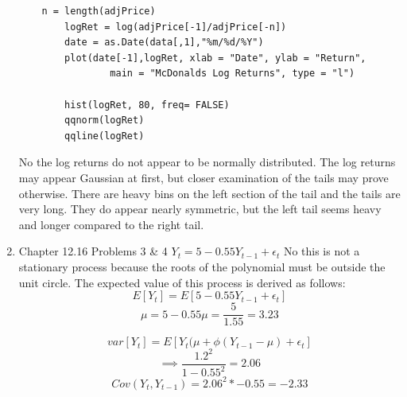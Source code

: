 \documentclass[letterpaper,12pt]{article}
\begin{document}
\begin{enumerate}
	\begin{lstlisting}
	n = length(adjPrice)
        logRet = log(adjPrice[-1]/adjPrice[-n])
        date = as.Date(data[,1],"%m/%d/%Y")
        plot(date[-1],logRet, xlab = "Date", ylab = "Return",
                main = "McDonalds Log Returns", type = "l")
        
        hist(logRet, 80, freq= FALSE)
        qqnorm(logRet)
        qqline(logRet)
	\end{lstlisting}

No the log returns do not appear to be normally distributed.  The log returns may appear Gaussian at first, but closer examination of the tails may prove otherwise. There are heavy bins on the left section of the tail and the tails are very long. They do appear nearly symmetric, but the left tail seems heavy and longer compared to the right tail.

\item Chapter 12.16 Problems 3 \& 4
 $Y_t = 5 - 0.55 Y_{t-1} + \epsilon_t$
No this is not a stationary process because the roots of the polynomial must be outside the unit circle.
The expected value of this process is derived as follows: 
\[
	E[Y_t] = E[5-0.55Y_{t-1} + \epsilon_t]
\]
\[
	\mu = 5 - 0.55\mu = \frac{5}{1.55} = 3.23
\]

\[
	var[Y_t] = E[Y_t(\mu + \phi(Y_{t-1} - \mu) + \epsilon_t]
\]
\[
	\implies \frac{1.2^2}{1- 0.55^2} = 2.06
\]
\[
	Cov(Y_t,Y_{t-1}) = 2.06^2 * -0.55 = -2.33
\]


\end{enumerate}
\end{document}
